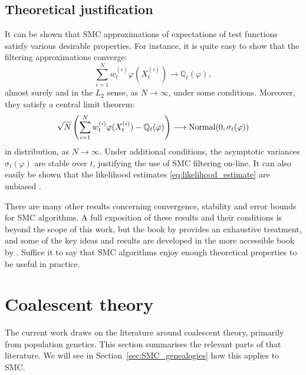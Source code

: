 \subsection{Theoretical justification}
\label{sec:SMC_theory}
It can be shown that SMC approximations of expectations of test functions satisfy various desirable properties. For instance, it is quite easy to show that the filtering approximations converge:
\begin{equation*}
\sum_{i=1}^N w_t^{(i)} \varphi( X_t^{(i)} ) 
\longrightarrow \mathbb{Q}_t(\varphi) ,
\end{equation*}
almost surely and in the $L_2$ sense, as $N\to\infty$, under some conditions.
Moreover, they satisfy a central limit theorem:
\begin{equation*}
\sqrt{N} \left( \sum_{i=1}^N w_t^{(i)} \varphi( X_t^{(i)} ) - \mathbb{Q}_t(\varphi) \right)
\longrightarrow  \operatorname{Normal}( 0, \sigma_t(\varphi) )
\end{equation*}
in distribution, as $N\to\infty$. Under additional conditions, the asymptotic variances $\sigma_t(\varphi)$ are stable over $t$, justifying the use of SMC filtering on-line.
It can also easily be shown that the likelihood estimates \eqref{eq:likelihood_estimate} are unbiased \parencite[see for example][Proposition 16.3]{chopin2020}.

There are many other results concerning convergence, stability and error bounds for SMC algorithms. A full exposition of these results and their conditions is beyond the scope of this work, but the book by \textcite{delmoral2013} provides an exhaustive treatment, and some of the key ideas and results are developed in the more accessible book by \textcite[Chapter 11]{chopin2020}.
Suffice it to say that SMC algorithms enjoy enough theoretical properties to be useful in practice.





\section{Coalescent theory}
\label{sec:coaltheory}
The current work draws on the literature around coalescent theory, primarily from population genetics. This section summarises the relevant parts of that literature. We will see in Section~\ref{sec:SMC_genealogies} how this applies to SMC.

